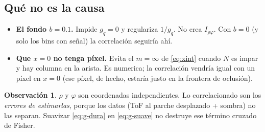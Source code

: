 \documentclass[11pt,a4paper]{article}
\theoremstyle{definition}
\newtheorem{obs}{Observación}
\begin{document}
\subsection{Qu\'e no es la causa}

\begin{itemize}[leftmargin=*]
  \item \textbf{El fondo $b=0.1$.} Impide $g_q=0$ y regulariza $1/g_q$. No
        crea $I_{\rho\varphi}$. Con $b=0$ (y solo los bins con se\~nal) la
        correlaci\'on seguir\'ia ah\'i.
  \item \textbf{Que $x=0$ no tenga p\'ixel.} Evita el $m=\infty$ de
        \eqref{eq:xint} cuando $N$ es impar y hay columna en la arista. Es
        numerica; la correlaci\'on vendr\'ia igual con un p\'ixel en $x=0$
        (ese p\'ixel, de hecho, estar\'ia justo en la frontera de oclusi\'on).
\end{itemize}

\begin{obs}
$\rho$ y $\varphi$ son coordenadas independientes. Lo correlacionado son los
\emph{errores de estimarlas}, porque los datos (ToF al parche desplazado +
sombra) no las separan. Suavizar \eqref{eq:g-dura} en \eqref{eq:g-suave} no
destruye ese t\'ermino cruzado de Fisher.
\end{obs}
\end{document}
